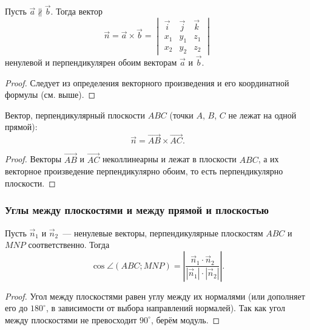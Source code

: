 \documentclass[12pt]{article}
\begin{document}
    \begin{corollary}
    	Пусть $\vec{a} \nparallel \vec{b}$. Тогда вектор
    	\[
    		\vec{n} = \vec{a} \times \vec{b} = \begin{vmatrix}
    			\vec{i} & \vec{j} & \vec{k} \\
    			x_1 & y_1 & z_1 \\
    			x_2 & y_2 & z_2
    		\end{vmatrix}
    	\]
    	ненулевой и перпендикулярен обоим векторам $\vec{a}$ и $\vec{b}$.
    \end{corollary}
    
    \begin{proof}
    	Следует из определения векторного произведения и его координатной формулы (см. выше).
    \end{proof}
    
    \begin{corollary}
    	Вектор, перпендикулярный плоскости $ABC$ (точки $A$, $B$, $C$ не лежат на одной прямой):
    	\[
    		\vec{n} = \vec{AB} \times \vec{AC}.
    	\]
    \end{corollary}
    
    \begin{proof}
    	Векторы $\vec{AB}$ и $\vec{AC}$ неколлинеарны и лежат в плоскости $ABC$, а их векторное произведение перпендикулярно обоим, то есть перпендикулярно плоскости.
    \end{proof}
    
    \subsubsection{Углы между плоскостями и между прямой и плоскостью}
    
    \begin{statement}
    	Пусть $\vec{n}_1$ и $\vec{n}_2$~--- ненулевые векторы, перпендикулярные плоскостям $ABC$ и $MNP$ соответственно. Тогда
    	\[
    		\cos \angle (ABC; MNP) = \left| \dfrac{\vec{n}_1 \cdot \vec{n}_2}{|\vec{n}_1| \cdot |\vec{n}_2|} \right|.
    	\]
    \end{statement}
    
    \begin{proof}
    	Угол между плоскостями равен углу между их нормалями (или дополняет его до $180^\circ$, в зависимости от выбора направлений нормалей). Так как угол между плоскостями не превосходит $90^\circ$, берём модуль.
    \end{proof}
    
\end{document}

